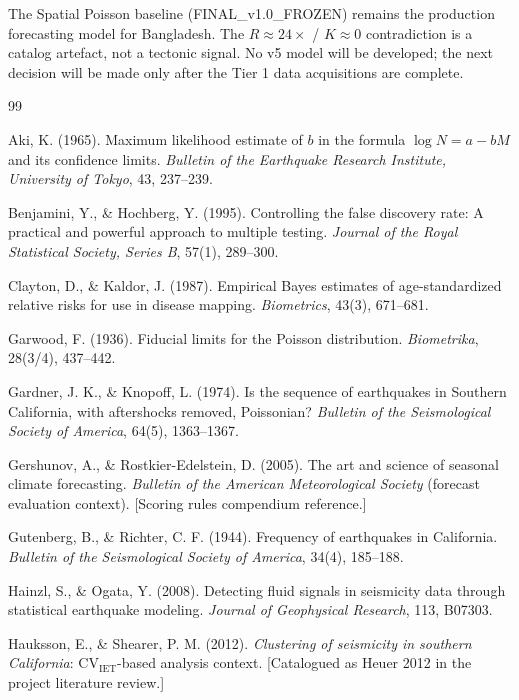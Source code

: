 \documentclass[10pt,a4paper,twocolumn]{article}
\begin{document}
The Spatial Poisson baseline (FINAL\_v1.0\_FROZEN) remains the production forecasting model for Bangladesh. The $R\approx24\times$ / $K\approx0$ contradiction is a catalog artefact, not a tectonic signal. No v5 model will be developed; the next decision will be made only after the Tier 1 data acquisitions are complete.

\onecolumn
\begin{thebibliography}{99}
\setlength{\itemsep}{2pt}

 Aki, K. (1965). Maximum likelihood estimate of $b$ in the formula $\log N = a - bM$ and its confidence limits. \emph{Bulletin of the Earthquake Research Institute, University of Tokyo}, 43, 237--239.

 Benjamini, Y., \& Hochberg, Y. (1995). Controlling the false discovery rate: A practical and powerful approach to multiple testing. \emph{Journal of the Royal Statistical Society, Series B}, 57(1), 289--300.

 Clayton, D., \& Kaldor, J. (1987). Empirical Bayes estimates of age-standardized relative risks for use in disease mapping. \emph{Biometrics}, 43(3), 671--681.

 Garwood, F. (1936). Fiducial limits for the Poisson distribution. \emph{Biometrika}, 28(3/4), 437--442.

 Gardner, J. K., \& Knopoff, L. (1974). Is the sequence of earthquakes in Southern California, with aftershocks removed, Poissonian? \emph{Bulletin of the Seismological Society of America}, 64(5), 1363--1367.

 Gershunov, A., \& Rostkier-Edelstein, D. (2005). The art and science of seasonal climate forecasting. \emph{Bulletin of the American Meteorological Society} (forecast evaluation context). [Scoring rules compendium reference.]

 Gutenberg, B., \& Richter, C. F. (1944). Frequency of earthquakes in California. \emph{Bulletin of the Seismological Society of America}, 34(4), 185--188.

 Hainzl, S., \& Ogata, Y. (2008). Detecting fluid signals in seismicity data through statistical earthquake modeling. \emph{Journal of Geophysical Research}, 113, B07303.

 Hauksson, E., \& Shearer, P. M. (2012). \emph{Clustering of seismicity in southern California}: CV$_{\text{IET}}$-based analysis context. [Catalogued as Heuer 2012 in the project literature review.]


\end{thebibliography}
\end{document}
